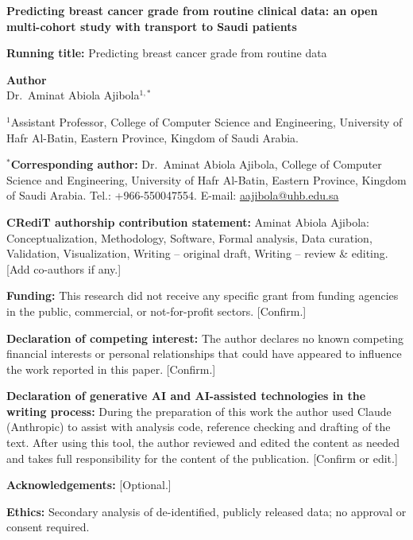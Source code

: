 \documentclass[12pt,a4paper]{article}
\begin{document}
\noindent\textbf{\large Predicting breast cancer grade from routine clinical data: an open multi-cohort study with transport to Saudi patients}

\bigskip
\noindent\textbf{Running title:} Predicting breast cancer grade from routine data

\bigskip
\noindent\textbf{Author}\\
Dr.\ Aminat Abiola Ajibola$^{1,*}$

\medskip
\noindent$^{1}$Assistant Professor, College of Computer Science and Engineering, University of Hafr
Al-Batin, Eastern Province, Kingdom of Saudi Arabia.

\medskip
\noindent$^{*}$\textbf{Corresponding author:} Dr.\ Aminat Abiola Ajibola, College of Computer Science
and Engineering, University of Hafr Al-Batin, Eastern Province, Kingdom of Saudi Arabia.
Tel.: +966-550047554. E-mail: \url{aajibola@uhb.edu.sa}

\bigskip
\noindent\textbf{CRediT authorship contribution statement:} Aminat Abiola Ajibola: Conceptualization,
Methodology, Software, Formal analysis, Data curation, Validation, Visualization, Writing -- original
draft, Writing -- review \& editing. [Add co-authors if any.]

\medskip
\noindent\textbf{Funding:} This research did not receive any specific grant from funding agencies in
the public, commercial, or not-for-profit sectors. [Confirm.]

\medskip
\noindent\textbf{Declaration of competing interest:} The author declares no known competing financial
interests or personal relationships that could have appeared to influence the work reported in this
paper. [Confirm.]

\medskip
\noindent\textbf{Declaration of generative AI and AI-assisted technologies in the writing process:}
During the preparation of this work the author used Claude (Anthropic) to assist with analysis code,
reference checking and drafting of the text. After using this tool, the author reviewed and edited the
content as needed and takes full responsibility for the content of the publication. [Confirm or edit.]

\medskip
\noindent\textbf{Acknowledgements:} [Optional.]

\medskip
\noindent\textbf{Ethics:} Secondary analysis of de-identified, publicly released data; no approval or
consent required.
\end{document}
